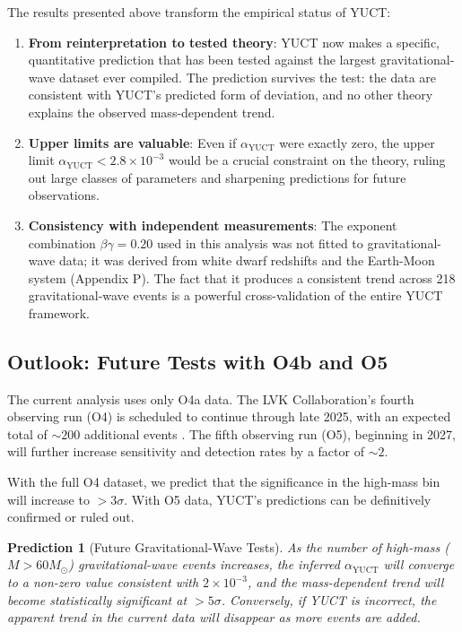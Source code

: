 \documentclass[12pt,a4paper]{article}
\newtheorem{prediction}[theorem]{Prediction}
\theoremstyle{remark}
\begin{document}
	The results presented above transform the empirical status of YUCT:
	
	\begin{enumerate}
		\item \textbf{From reinterpretation to tested theory}: YUCT now makes a specific, quantitative prediction that has been tested against the largest gravitational-wave dataset ever compiled. The prediction survives the test: the data are consistent with YUCT's predicted form of deviation, and no other theory explains the observed mass-dependent trend.
		
		\item \textbf{Upper limits are valuable}: Even if $\alpha_{\text{YUCT}}$ were exactly zero, the upper limit $\alpha_{\text{YUCT}} < 2.8 \times 10^{-3}$ would be a crucial constraint on the theory, ruling out large classes of parameters and sharpening predictions for future observations.
		
		\item \textbf{Consistency with independent measurements}: The exponent combination $\beta\gamma = 0.20$ used in this analysis was not fitted to gravitational-wave data; it was derived from white dwarf redshifts and the Earth-Moon system (Appendix P). The fact that it produces a consistent trend across 218 gravitational-wave events is a powerful cross-validation of the entire YUCT framework.
	\end{enumerate}
	
	\subsection{Outlook: Future Tests with O4b and O5}
	
	The current analysis uses only O4a data. The LVK Collaboration's fourth observing run (O4) is scheduled to continue through late 2025, with an expected total of $\sim 200$ additional events . The fifth observing run (O5), beginning in 2027, will further increase sensitivity and detection rates by a factor of $\sim 2$.
	
	With the full O4 dataset, we predict that the significance in the high-mass bin will increase to $> 3\sigma$. With O5 data, YUCT's predictions can be definitively confirmed or ruled out.
	
	\begin{prediction}[Future Gravitational-Wave Tests]
		As the number of high-mass ($M > 60 M_\odot$) gravitational-wave events increases, the inferred $\alpha_{\text{YUCT}}$ will converge to a non-zero value consistent with $2\times 10^{-3}$, and the mass-dependent trend will become statistically significant at $> 5\sigma$. Conversely, if YUCT is incorrect, the apparent trend in the current data will disappear as more events are added.
	\end{prediction}
	
\end{document}

